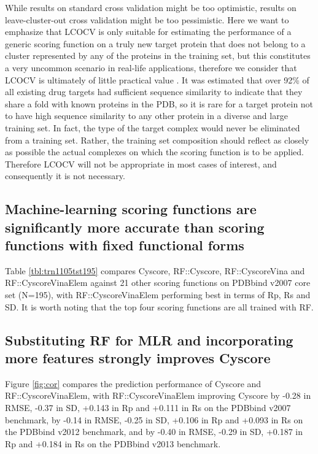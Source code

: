 \documentclass[linenumbers]{bmcart}
\begin{document}
While results on standard cross validation might be too optimistic, results on leave-cluster-out cross validation might be too pessimistic. Here we want to emphasize that LCOCV is only suitable for estimating the performance of a generic scoring function on a truly new target protein that does not belong to a cluster represented by any of the proteins in the training set, but this constitutes a very uncommon scenario in real-life applications, therefore we consider that LCOCV is ultimately of little practical value \cite{908}. It was estimated \cite{1417} that over 92\% of all existing drug targets had sufficient sequence similarity to indicate that they share a fold with known proteins in the PDB, so it is rare for a target protein not to have high sequence similarity to any other protein in a diverse and large training set. In fact, the type of the target complex would never be eliminated from a training set. Rather, the training set composition should reflect as closely as possible the actual complexes on which the scoring function is to be applied. Therefore LCOCV will not be appropriate in most cases of interest, and consequently it is not necessary. 

\subsection*{Machine-learning scoring functions are significantly more accurate than scoring functions with fixed functional forms}

Table \ref{tbl:trn1105tst195} compares Cyscore, RF::Cyscore, RF::CyscoreVina and RF::CyscoreVinaElem against 21 other scoring functions on PDBbind v2007 core set (N=195), with RF::CyscoreVinaElem performing best in terms of Rp, Rs and SD. It is worth noting that the top four scoring functions are all trained with RF.

\subsection*{Substituting RF for MLR and incorporating more features strongly improves Cyscore}

Figure \ref{fig:cor} compares the prediction performance of Cyscore and RF::CyscoreVinaElem, with RF::CyscoreVinaElem improving Cyscore by -0.28 in RMSE, -0.37 in SD, +0.143 in Rp and +0.111 in Rs on the PDBbind v2007 benchmark, by -0.14 in RMSE, -0.25 in SD, +0.106 in Rp and +0.093 in Rs on the PDBbind v2012 benchmark, and by -0.40 in RMSE, -0.29 in SD, +0.187 in Rp and +0.184 in Rs on the PDBbind v2013 benchmark.
\end{document}
